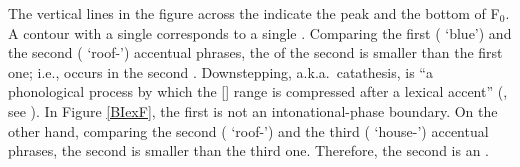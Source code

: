 The vertical lines in the figure across the  indicate
the peak and the bottom of F$_{0}$.
A contour with a single  corresponds to a single .
Comparing the first ( `blue') and the second ( `roof-') accentual phrases,
the  of the second  is smaller than the first one;
i.e.,  occurs in the second .
Downstepping, a.k.a.~catathesis, is ``a phonological process by which the [] range is compressed after a lexical accent'' (, see ).
In Figure \ref{BIexF}, the first  is not an intonational-phase boundary.
On the other hand,
comparing the second ( `roof-') and the third ( `house-') accentual phrases,
the second  is smaller than the third one.
Therefore,
the second  is an .

